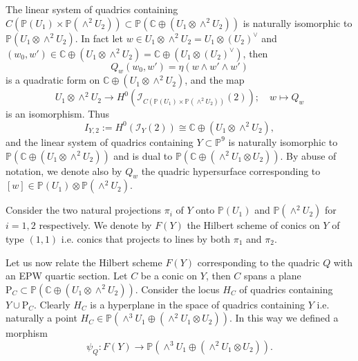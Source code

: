\documentclass[a4paper,11pt]{amsart}
\theoremstyle{definition}
\numberwithin{equation}{section}
\numberwithin{equation}{section} \theoremstyle{definition}
\begin{document}
The linear system of quadrics containing $C({{\mathbb{P}}}(U_1)\times {{\mathbb{P}}}(\wedge^2 U_2))\subset {{\mathbb{P}}}({{\mathbb{C}  }}\oplus (U_1\otimes \wedge^2 U_2))$ is naturally isomorphic to ${{\mathbb{P}}}(U_1 \otimes \wedge^2 U_2)$.  In fact let $w\in U_1\otimes \wedge^2 U_2=U_1\otimes (U_2)^{\vee}$ and $(w_0,w')\in {{\mathbb{C}  }}\oplus(U_1\otimes \wedge^2 U_2)= {{\mathbb{C}  }}\oplus(U_1\otimes (U_2)^{\vee})$, then 
\[
Q_w(w_0,w')=\eta(w\wedge w'\wedge w')
\]
is a quadratic form on ${{\mathbb{C}  }}\oplus(U_1\otimes \wedge^2 U_2)$, and
 the map
\[
U_1 \otimes \wedge^2 U_2\to H^0(\mathcal{I}_{C({{\mathbb{P}}}(U_1)\times {{\mathbb{P}}}(\wedge^2 U_2))}(2));\quad w\mapsto Q_w
\]
is an isomorphism.  Thus 
\[
I_{Y,2}:= H^0(\mathcal{I}_{Y}(2))\cong {{\mathbb{C}  }}\oplus (U_1 \otimes \wedge^2 U_2),
\]
and the linear system of quadrics containing $Y\subset {{\mathbb{P}}}^9$ is naturally isomorphic to ${{\mathbb{P}}}({{\mathbb{C}  }}\oplus (U_1 \otimes \wedge^2 U_2))$ and is dual to ${{\mathbb{P}}}({{\mathbb{C}  }}\oplus (\wedge^2 U_1 \otimes U_2))$. By abuse of notation, we denote also by $Q_{w}$ the quadric hypersurface corresponding to $[w]\in {{\mathbb{P}}}(U_1)\otimes {{\mathbb{P}}}(\wedge^2 U_2)$.

Consider the two natural projections $\pi_i$ of  $Y$ onto  ${{\mathbb{P}}}(U_1)$ and ${{\mathbb{P}}}(\wedge^2 U_2)$ for $i=1,2$ respectively.
We denote by $F(Y)$ the Hilbert scheme of conics on $Y$ of type $(1,1)$ i.e. conics that projects to lines by both $\pi_1$ and $\pi_2$. 

Let us now relate the Hilbert scheme $F(Y)$ corresponding to the quadric $Q$ with an EPW quartic section.
Let $C$ be a conic on $Y$, then $C$ spans a plane ${{\mathrm{P}}}_C\subset {{\mathbb{P}}}({{\mathbb{C}  }}\oplus (U_1\otimes \wedge^2 U_2))$. Consider the locus $H_C$ of quadrics containing $Y\cup {{\mathrm{P}}}_C$. Clearly
$H_C$ is a hyperplane in the space of quadrics containing $Y$ i.e. naturally a point $H_C\in {{\mathbb{P}}}(\wedge^3 U_1 \oplus (\wedge^2 U_1 \otimes U_2)).$
In this way we defined a morphism
\[
\psi_Q: F(Y)\to {{\mathbb{P}}}(\wedge^3 U_1 \oplus (\wedge^2 U_1 \otimes U_2)).
\]
\end{document}
